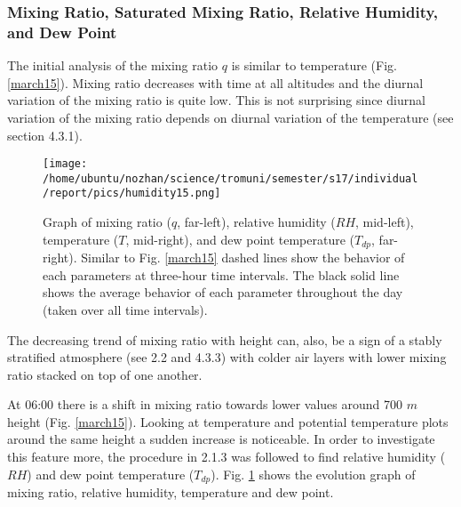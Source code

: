 \documentclass[a4paper,12pt]{article}
\numberwithin{equation}{section} %
\begin{document}


\subsubsection{Mixing Ratio, Saturated Mixing Ratio, Relative Humidity, and Dew Point}

The initial analysis of the mixing ratio $q$ is similar to temperature (Fig. \ref{march15}). Mixing ratio decreases with time at all altitudes and the diurnal variation of the mixing ratio is quite low. This is not surprising since diurnal variation of the mixing ratio depends on diurnal variation of the temperature (see section 4.3.1).

\begin{figure}[bhp]
\texttt{[image: /home/ubuntu/nozhan/science/tromuni/semester/s17/individual/report/pics/humidity15.png]}
\caption{Graph of mixing ratio ($q$, far-left), relative humidity ($RH$, mid-left), temperature ($T$, mid-right), and dew point temperature ($T_{dp}$, far-right). Similar to Fig. \ref{march15} dashed lines show the behavior of each parameters at three-hour time intervals. The black solid line shows the average behavior of each parameter throughout the day (taken over all time intervals).}
\label{humidity15}
\end{figure}

The decreasing trend of mixing ratio with height can, also, be a sign of a stably stratified atmosphere (see 2.2 and 4.3.3) with colder air layers with lower mixing ratio stacked on top of one another.

At 06:00 there is a shift in mixing ratio towards lower values around 700 $m$ height (Fig. \ref{march15}). Looking at temperature and potential temperature plots around the same height a sudden increase is noticeable. In order to investigate this feature more, the procedure in 2.1.3 was followed to find relative humidity ($RH$) and dew point temperature ($T_{dp}$). Fig. \ref{humidity15} shows the evolution graph of mixing ratio, relative humidity, temperature and dew point. 
\end{document}
